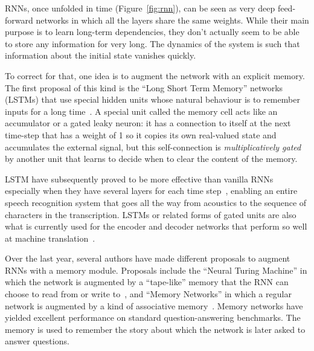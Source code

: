 \documentclass[10pts]{article}
\newcommand{\citep}[1]{\cite{#1}}
\begin{document}
RNNs, once unfolded in time (Figure~\ref{fig:rnn}), can be seen as very deep
feed-forward networks in which all the layers share the same weights.
While their main purpose is to learn long-term dependencies, they
don't actually seem to be able to store any information for very
long. The dynamics of the system is such that information about the
initial state vanishes quickly. 

To correct for that, one idea is to augment the network with an
explicit memory. The first proposal of this kind is the ``Long Short
Term Memory'' networks (LSTMs) that use special hidden units whose
natural behaviour is to remember inputs for a long
time~\citep{Hochreiter+Schmidhuber-1997}.  
A special unit called the memory cell
acts like an accumulator or a gated leaky neuron: it has a connection
to itself at the next time-step that has a weight of 1 so it copies
its own real-valued state and accumulates the external signal, but
this self-connection is {\em multiplicatively gated} by another unit
that learns to decide when to clear the content of the memory.

LSTM have subsequently proved to be more effective than vanilla RNNs
especially when they have several layers for each time step~\citep{Graves-et-al-ICASSP2013},
enabling an entire speech recognition system that goes
all the way from acoustics to the
sequence of characters in the transcription.  LSTMs or related forms
of gated units are also what is currently used for the encoder and
decoder networks that perform so well at machine
translation~\citep{Bahdanau-et-al-ICLR2015-small,Sutskever-et-al-NIPS2014}.

Over the last year, several authors have made different proposals to
augment RNNs with a memory module. 
Proposals include the ``Neural Turing Machine'' in which the
network is augmented by a ``tape-like'' memory that the RNN
can choose to read from or write to~\citep{Graves-et-al-arxiv2014}, and
``Memory Networks'' in which a regular network is augmented by a
kind of associative memory~\citep{weston-memorynet-2014}. Memory
networks have yielded excellent performance on standard
question-answering benchmarks. The memory is used to remember the
story about which the network is later asked to answer questions.
\end{document}
